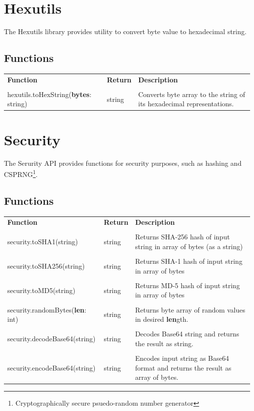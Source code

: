 \documentclass[10pt, stock]{memoir}
\let\oldsection\section
\renewcommand\section{\clearpage\oldsection}
\begin{document}
\section{Hexutils}

The Hexutils library provides utility to convert byte value to hexadecimal string.

\subsection{Functions}

\begin{tabularx}{\textwidth}{l l X}
	\textbf{\large Function} & \textbf{\large Return} & \textbf{\large Description}
	\\ \\
	\endhead
	hexutils.toHexString(\textbf{bytes}: string) & string & Converts byte array to the string of its hexadecimal representations.
\end{tabularx}


\section{Security}

The Serurity API provides functions for security purposes, such as hashing and CSPRNG\footnote{Cryptographically secure psuedo-random number generator}.

\subsection{Functions}

\begin{tabularx}{\textwidth}{l l X}
	\textbf{\large Function} & \textbf{\large Return} & \textbf{\large Description}
	\\ \\
	\endhead
	security.toSHA1(string) & string & Returns SHA-256 hash of input string in array of bytes (as a string)
	\\ \\
	security.toSHA256(string) & string & Returns SHA-1 hash of input string in array of bytes
		\\ \\
	security.toMD5(string) & string & Returns MD-5 hash of input string in array of bytes
	\\ \\
	security.randomBytes(\textbf{len}: int) & string & Returns byte array of random values in desired \textbf{len}gth.
	\\ \\
	security.decodeBase64(string) & string & Decodes Base64 string and returns the result as string.
	\\ \\
	security.encodeBase64(string) & string & Encodes input string as Base64 format and returns the result as array of bytes.
\end{tabularx}
\end{document}
